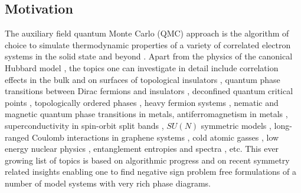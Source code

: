 \documentclass{SciPost}
\begin{document}
\subsection{Motivation}
%
The auxiliary field quantum Monte Carlo (QMC) approach is the algorithm of choice to simulate  thermodynamic properties of a variety of correlated electron systems in the solid state and beyond \cite{Blankenbecler81,White89,Sugiyama86,Sorella89, Duane87, Kennedy06, Assaad08_rev, gubernatis_kawashima_werner_2016}.  
Apart from the physics of the  canonical Hubbard model 
\cite{Scalapino07,LeBlanc15},   the topics one can investigate in detail include correlation effects in the bulk and on surfaces of topological insulators \cite{Hohenadler10,Zheng11}, quantum phase transitions between  Dirac fermions  and insulators \cite{Assaad13,Toldin14,Otsuka16,Chandrasekharan13,Chandrasekharan15},  
deconfined quantum critical points \cite{Li15a,Assaad16}, topologically ordered phases \cite{Assaad16}, heavy fermion systems \cite{Assaad99a,Capponi00}, nematic \cite{Schattner15} and magnetic  \cite{Xu16b} quantum phase transitions in metals, antiferromagnetism in metals \cite{Berg12},    superconductivity in spin-orbit split bands \cite{Tang14_1}, $SU(N)$ symmetric models \cite{Assaad04,Lang13},  long-ranged Coulomb interactions in graphene systems \cite{Hohenadler14,Tang15},  cold atomic gasses  \cite{Rigol03},  low energy nuclear physics \cite{Lee09},  entanglement entropies and spectra \cite{Grover13,Broecker14,Assaad13a,Assaad15, Broecker16},  etc. 
This ever growing list of topics  is based on  algorithmic progress and on recent symmetry related insights  \cite{Wu04,Huffman14,Yao14a,Wei16,Li16} enabling one to  find  negative sign  problem  free formulations of a number of model systems  with very rich phase diagrams.    
\end{document}
